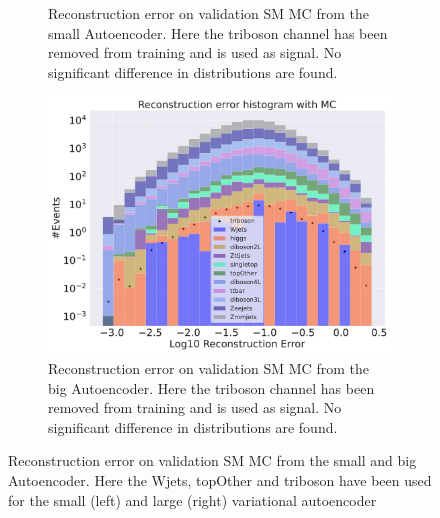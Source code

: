 \begin{figure}[H]
\begin{subfigure}{.45\textwidth}
        \caption{Reconstruction error on validation SM MC from the small Autoencoder. Here the triboson channel has been removed from training and 
        is used as signal. No significant difference in distributions are found. }
        \label{fig:vae_small_triboson}
    \end{subfigure}
    \hfill 
    \begin{subfigure}{.45\textwidth}
        \includegraphics[width=\textwidth]{Figures/VAE_testing/big/b_data_recon_big_rm3_feats_sig_triboson.pdf}
        \caption{Reconstruction error on validation SM MC from the big Autoencoder. Here the triboson channel has been removed from training and 
        is used as signal. No significant difference in distributions are found. }
        \label{fig:vae_big_triboson}
    \end{subfigure}
    \hfill  
    \caption[VAE | Channel removal, Wjets, topOther, triboson]{Reconstruction error on validation SM MC from the small and big Autoencoder. 
    Here the Wjets, topOther and triboson have been used for the small (left) and large (right) variational autoencoder}
    \label{fig:vae_big_channel4}
\end{figure}

